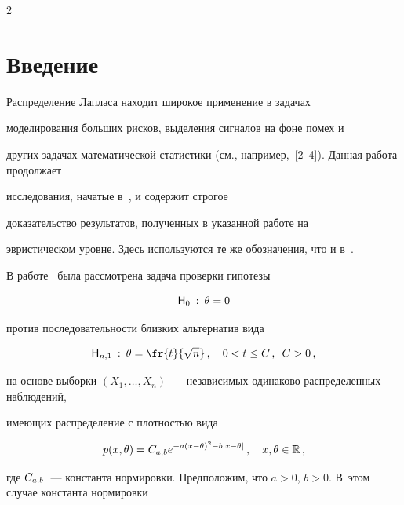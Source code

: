       \begin{multicols}{2}





      \label{st\stat}





\section{Введение}





Распределение Лапласа находит широкое применение в задачах


моделирования больших рисков, выделения сигналов на фоне помех и


других задачах математической статистики (см., например,~[2--4]). Данная работа продолжает


исследования, начатые в~\cite{article}, и содержит строгое


доказательство результатов, полученных в указанной работе на


эвристическом уровне. Здесь используются те же обозначения, что и в~\cite{article}.





В работе~\cite{article} была рассмотрена задача проверки гипотезы


$$


{\sf H}_0 \::\: \theta = 0


$$


против последовательности близких альтернатив вида


$$


{\sf H}_{n,1} \::\: \theta = \fr{t}{\sqrt{n}}\,, \quad 0 < t \leq C\,, \enskip C > 0\,,


$$


на основе выборки $(X_1, \dots, X_n)$~--- независимых одинаково распределенных наблюдений, 


имеющих распределение с плотностью вида


\begin{equation}


\label{l1}


p(x, \theta) = \cab e^{-a(x - \theta)^2- b|x - \theta|}\,,\quad x, \theta \in {\mathbb{R}}\,,


\end{equation}


где $C_{a,b}$~--- константа нормировки. Предположим, что $a>0$, $b>0$. В~этом случае константа нормировки 



\end{multicols}
